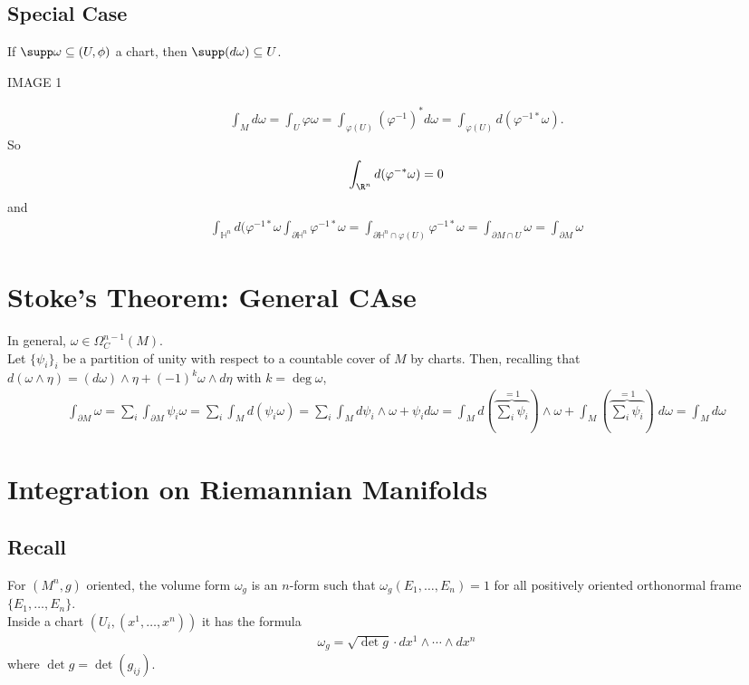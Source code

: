 \documentclass[11pt]{article}
\begin{document}
\subsection*{Special Case}
\label{sec:org5e87607}
If \(\supp\omega\subseteq(U,\phi)\) a chart, then \(\supp(d\omega)\subseteq U\).\\
\begin{center}
IMAGE 1\\
\end{center}
\begin{align*}
  \int_{M}d\omega
  =\int_{U}\varphi\omega
  =\int_{\varphi(U)}(\varphi^{-1})^{*}d\omega
  =\int_{\varphi(U)}d(\varphi^{-1*}\omega).
\end{align*}
So\\
\begin{align*}
  \int_{\R^{n}}d(\varphi^{-*}\omega)=0
\end{align*}
and\\
\begin{align*}
  \int_{\mathbb{H}^{n}}d(\varphi^{-1*}\omega
  \int_{\partial\mathbb{H}^{n}}\varphi^{-1*}\omega
  =\int_{\partial\mathbb{H}^{n}\cap\varphi(U)}\varphi^{-1*}\omega
  =\int_{\partial M\cap U}\omega
  =\int_{\partial M}\omega
\end{align*}
\section*{Stoke's Theorem: General CAse}
\label{sec:org4563139}
In general, \(\omega\in\Omega_{C}^{n-1}(M)\).\\
Let \(\{\psi_{i}\}_{i}\) be a partition of unity with respect to a countable cover of \(M\) by charts. Then, recalling that \(d(\omega\wedge\eta)=(d\omega)\wedge\eta+(-1)^{k}\omega\wedge d\eta\) with \(k=\deg\omega\),\\
\begin{align*}
  \int_{\partial M}\omega
  =\sum_{i}\int_{\partial M}\psi_{i}\omega
  =\sum_{i}\int_{M}d(\psi_{i}\omega)
  =\sum_{i}\int_{M}d\psi_{i}\wedge\omega+\psi_{i}d\omega
  =\int_{M}d\left( \overbrace{\sum_{i}\psi_{i}}^{=1} \right)\wedge\omega+\int_{M}\left( \overbrace{\sum_{i}\psi_{i}}^{=1}\right)\;d\omega
  =\int_{M}d\omega
\end{align*}
\section*{Integration on Riemannian Manifolds}
\label{sec:org501c257}
\subsection*{Recall}
\label{sec:orge632db5}
For \((M^{n},g)\) oriented, the volume form \(\omega_{g}\) is an \(n\)-form such that \(\omega_{g}(E_{1},\ldots,E_{n})=1\) for all positively oriented orthonormal frame \(\{E_{1},\ldots,E_{n}\}\).\\
Inside a chart \((U_{i},(x^{1},\ldots,x^{n}))\) it has the formula\\
\begin{align*}
  \omega_{g}=\sqrt{\det g}\cdot dx^{1}\wedge\cdots\wedge dx^{n}
\end{align*}
where \(\det g=\det(g_{ij})\).\\
\end{document}
